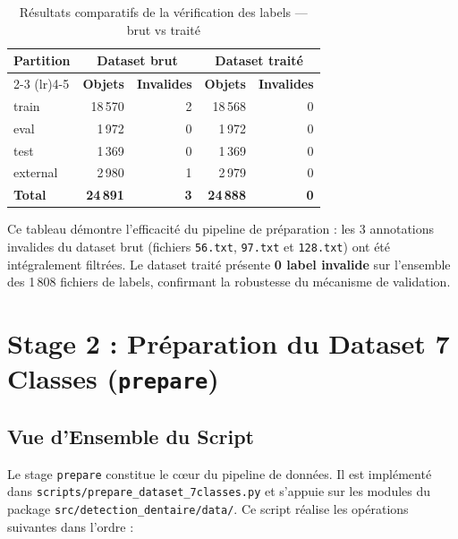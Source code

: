 \documentclass{rapportENSIAS}
\newcommand{\projectpath}[1]{\texttt{#1}}
\begin{document}
\begin{table}[H]
\centering
\caption{Résultats comparatifs de la vérification des labels — brut vs traité}
\label{tab:verify_comparison}
\begin{tabular}{lrrrr}
\toprule
\textbf{Partition} & \multicolumn{2}{c}{\textbf{Dataset brut}}
                   & \multicolumn{2}{c}{\textbf{Dataset traité}} \\
\cmidrule(lr){2-3} \cmidrule(lr){4-5}
                   & \textbf{Objets} & \textbf{Invalides}
                   & \textbf{Objets} & \textbf{Invalides} \\
\midrule
train    & 18\,570 & 2 & 18\,568 & 0 \\
eval     & 1\,972  & 0 & 1\,972  & 0 \\
test     & 1\,369  & 0 & 1\,369  & 0 \\
external & 2\,980  & 1 & 2\,979  & 0 \\
\midrule
\textbf{Total} & \textbf{24\,891} & \textbf{3} & \textbf{24\,888} & \textbf{0} \\
\bottomrule
\end{tabular}
\end{table}

Ce tableau démontre l'efficacité du pipeline de préparation : les 3 annotations
invalides du dataset brut (fichiers \texttt{56.txt}, \texttt{97.txt} et
\texttt{128.txt}) ont été intégralement filtrées. Le dataset traité présente
\textbf{0 label invalide} sur l'ensemble des 1\,808 fichiers de labels,
confirmant la robustesse du mécanisme de validation.

\section{Stage 2 : Préparation du Dataset 7 Classes (\texttt{prepare})}

\subsection{Vue d'Ensemble du Script}

Le stage \texttt{prepare} constitue le cœur du pipeline de données. Il est
implémenté dans \projectpath{scripts/prepare\_dataset\_7classes.py} et
s'appuie sur les modules du package \projectpath{src/detection\_dentaire/data/}.
Ce script réalise les opérations suivantes dans l'ordre :
\end{document}
